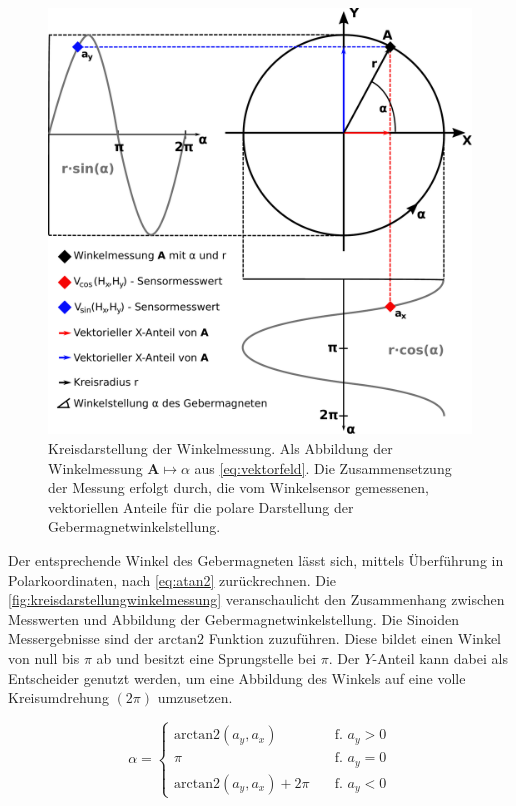 \clearpage


\begin{figure}[tph]
	\centering
	\includegraphics[width=0.7\linewidth]{chapters/images/2-Grundlagen/Kreisdarstellung_Winkelmessung}
	\caption[Kreisdarstellung der Winkelmessung]{Kreisdarstellung der Winkelmessung. Als Abbildung der
		Winkelmessung $\mathbf{A}\mapsto\alpha$ aus	\autoref{eq:vektorfeld}. Die Zusammensetzung der Messung erfolgt 
		durch, die vom Winkelsensor gemessenen, vektoriellen Anteile für die polare Darstellung der 
		Gebermagnetwinkelstellung.}
	\label{fig:kreisdarstellungwinkelmessung}
\end{figure}

Der entsprechende Winkel des Gebermagneten lässt sich, mittels Überführung in Polarkoordinaten, nach \autoref{eq:atan2} 
zurückrechnen. Die \autoref{fig:kreisdarstellungwinkelmessung} veranschaulicht den Zusammenhang zwischen Messwerten und 
Abbildung der Gebermagnetwinkelstellung. Die Sinoiden Messergebnisse sind der $\text{arctan2}$ Funktion zuzuführen. 
Diese bildet einen Winkel von null bis $\pi$ ab und besitzt eine Sprungstelle bei $\pi$. Der $Y$-Anteil kann dabei 
als Entscheider genutzt werden, um eine Abbildung des Winkels auf eine volle Kreisumdrehung $(2\pi)$ umzusetzen. 


\begin{equation}\label{eq:atan2}
\alpha = 
	\begin{cases}
	\text{arctan2}(a_y,a_x)        &\quad \textrm{f. } a_y > 0 \\
	\pi							   &\quad \textrm{f. } a_y = 0 \\
	\text{arctan2}(a_y,a_x) + 2\pi &\quad \textrm{f. } a_y < 0
	\end{cases}
\end{equation}
